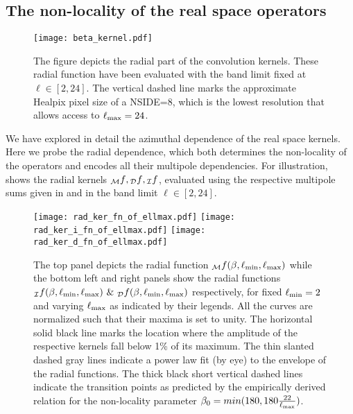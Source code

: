 \subsection{The non-locality of the real space operators} \label{sec:radial_locality}
%
\begin{figure}[t]
\centering
\texttt{[image: beta\_kernel.pdf]}
\caption{The figure depicts the radial part of the convolution kernels. These radial function have been evaluated with the band limit fixed at $\ell \in [2,24]$. The vertical dashed line marks the approximate Healpix pixel size of a NSIDE=8, which is the lowest resolution that allows access to $\ell_{\rm max}=24$.}
\label{fig:beta_kernel}
\end{figure}
%
We have explored in detail the  azimuthal dependence of the real space kernels.  Here we probe the radial dependence, which both  determines the non-locality of the operators and encodes all their multipole dependencies. For illustration,  shows the radial kernels ${_{\mathcal{M}}f}, {_{\mathcal{D}}f},{_{\mathcal{I}}f}$, evaluated using the respective multipole sums given in  and  in the band limit $\ell \in [2,24]$. 
%
\begin{figure}[t]
\texttt{[image: rad\_ker\_fn\_of\_ellmax.pdf]}\hfill
\texttt{[image: rad\_ker\_i\_fn\_of\_ellmax.pdf]}\hfill
\texttt{[image: rad\_ker\_d\_fn\_of\_ellmax.pdf]}
\caption{The top panel depicts the radial function  ${_{\mathcal{M}}f}(\beta,\ell_{\rm min},\ell_{\rm max})$ while the bottom left and right panels show the radial functions ${}_{\mathcal{I}}f(\beta,\ell_{\rm min},\ell_{\rm max}) ~\&~ {}_{\mathcal{D}}f(\beta,\ell_{\rm min},\ell_{\rm max})$ respectively, for fixed $\ell_{\rm min}=2$ and varying $\ell_{\rm max}$ as indicated by their legends. All the curves are normalized such that their maxima is set to unity. The horizontal solid black line marks the location where the amplitude of the respective kernels fall below 1\% of its maximum. The thin slanted dashed gray lines indicate a power law fit (by eye) to the envelope of the radial functions. The thick black short vertical dashed lines indicate the transition points as predicted by the empirically derived relation for the non-locality parameter $\beta_0=min(180,180 \frac{22}{\ell_{\rm max}})$.}
\label{fig:rad_ker_decay}
\end{figure}
%

